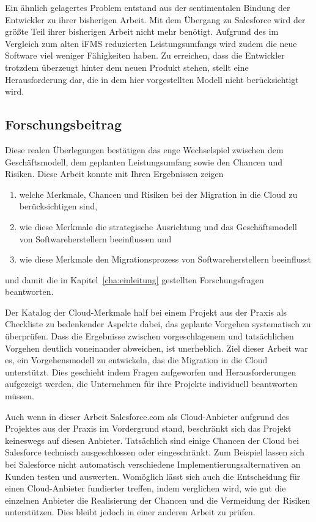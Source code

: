 Ein ähnlich gelagertes Problem entstand aus der sentimentalen Bindung der 
Entwickler zu ihrer bisherigen Arbeit. Mit dem Übergang zu Salesforce wird der 
größte Teil ihrer bisherigen Arbeit nicht mehr benötigt. Aufgrund des im 
Vergleich zum alten iFMS reduzierten Leistungsumfangs wird zudem die neue 
Software viel weniger Fähigkeiten haben. Zu erreichen, dass die 
Entwickler trotzdem überzeugt hinter dem neuen Produkt stehen, stellt eine 
Herausforderung dar, die in dem hier vorgestellten Modell nicht berücksichtigt 
wird.

\subsection{Forschungsbeitrag}
Diese realen Überlegungen bestätigen das enge Wechselspiel zwischen dem 
Geschäftsmodell, dem geplanten Leistungsumfang sowie den Chancen und Risiken.
Diese Arbeit konnte mit Ihren Ergebnissen zeigen
\begin{enumerate}
	\item welche Merkmale, Chancen und Risiken bei der Migration in die 
Cloud zu berücksichtigen sind,
	\item wie diese Merkmale die strategische Ausrichtung und das 
Geschäftsmodell von Softwareherstellern beeinflussen und
	\item wie diese Merkmale den Migrationsprozess von Softwareherstellern 
beeinflusst
\end{enumerate}
und damit die in Kapitel~\ref{cha:einleitung} gestellten Forschungsfragen 
beantworten.

Der Katalog der Cloud-Merkmale half bei einem Projekt aus der Praxis als 
Checkliste zu bedenkender Aspekte dabei, das geplante Vorgehen systematisch zu 
überprüfen. Dass die Ergebnisse zwischen vorgeschlagenem und tatsächlichen 
Vorgehen deutlich voneinander abweichen, ist unerheblich. Ziel dieser Arbeit war 
es, ein Vorgehensmodell zu entwickeln, das die Migration in die Cloud 
unterstützt. Dies geschieht indem Fragen aufgeworfen und Herausforderungen 
aufgezeigt werden, die Unternehmen für ihre Projekte individuell beantworten 
müssen. 

Auch wenn in dieser Arbeit Salesforce.com als Cloud-Anbieter aufgrund des 
Projektes aus der Praxis im Vordergrund stand, beschränkt sich das Projekt 
keineswegs auf diesen Anbieter. Tatsächlich sind einige Chancen der Cloud bei 
Salesforce technisch ausgeschlossen oder eingeschränkt. Zum Beispiel lassen 
sich bei Salesforce nicht automatisch verschiedene Implementierungsalternativen 
an Kunden testen und auswerten. 
Womöglich lässt sich auch die Entscheidung für 
einen Cloud-Anbieter fundierter treffen, indem verglichen wird, wie gut die 
einzelnen Anbieter die Realisierung der Chancen und die Vermeidung der Risiken 
unterstützen. Dies bleibt jedoch in einer anderen Arbeit zu prüfen.

